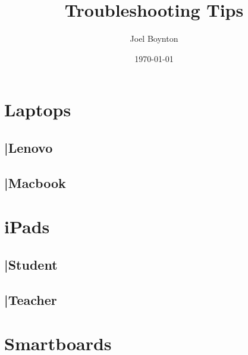 \documentclass[11pt]{article}
\author{Joel Boynton}
\date{\today}
\title{Troubleshooting Tips}
\begin{document}
\maketitle
\section{Laptops}
\label{sec:orgdd31b5d}
\subsection{|Lenovo}
\label{sec:orgdd35841}
\subsection{|Macbook}
\label{sec:org08b46f0}
\section{iPads}
\label{sec:orgeeca3ff}
\subsection{|Student}
\label{sec:orgeff9bd8}
\subsection{|Teacher}
\label{sec:orgc13bf4a}
\section{Smartboards}
\label{sec:org4892fe2}
\end{document}
